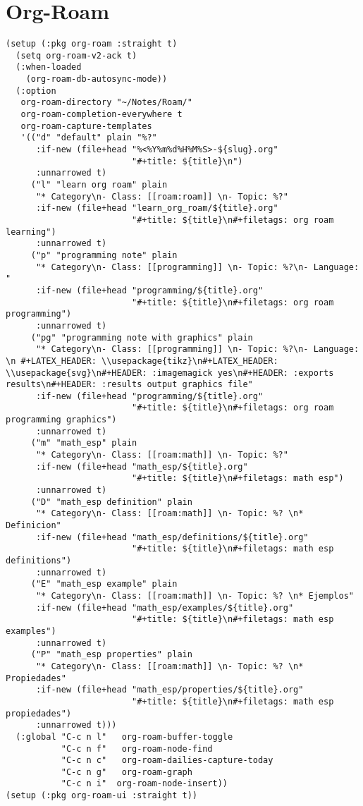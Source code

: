 \documentclass[11pt]{article}
\begin{document}
\section{Org-Roam}
\label{sec:orgd7336d6}

\begin{verbatim}
(setup (:pkg org-roam :straight t)
  (setq org-roam-v2-ack t)
  (:when-loaded
    (org-roam-db-autosync-mode))
  (:option
   org-roam-directory "~/Notes/Roam/"
   org-roam-completion-everywhere t
   org-roam-capture-templates
   '(("d" "default" plain "%?"
      :if-new (file+head "%<%Y%m%d%H%M%S>-${slug}.org"
                         "#+title: ${title}\n")
      :unnarrowed t)
     ("l" "learn org roam" plain
      "* Category\n- Class: [[roam:roam]] \n- Topic: %?"
      :if-new (file+head "learn_org_roam/${title}.org"
                         "#+title: ${title}\n#+filetags: org roam learning")
      :unnarrowed t)
     ("p" "programming note" plain
      "* Category\n- Class: [[programming]] \n- Topic: %?\n- Language: "
      :if-new (file+head "programming/${title}.org"
                         "#+title: ${title}\n#+filetags: org roam programming")
      :unnarrowed t)
     ("pg" "programming note with graphics" plain
      "* Category\n- Class: [[programming]] \n- Topic: %?\n- Language: \n #+LATEX_HEADER: \\usepackage{tikz}\n#+LATEX_HEADER: \\usepackage{svg}\n#+HEADER: :imagemagick yes\n#+HEADER: :exports results\n#+HEADER: :results output graphics file"
      :if-new (file+head "programming/${title}.org"
                         "#+title: ${title}\n#+filetags: org roam programming graphics")
      :unnarrowed t)
     ("m" "math_esp" plain
      "* Category\n- Class: [[roam:math]] \n- Topic: %?"
      :if-new (file+head "math_esp/${title}.org"
                         "#+title: ${title}\n#+filetags: math esp")
      :unnarrowed t)
     ("D" "math_esp definition" plain
      "* Category\n- Class: [[roam:math]] \n- Topic: %? \n* Definicion"
      :if-new (file+head "math_esp/definitions/${title}.org"
                         "#+title: ${title}\n#+filetags: math esp definitions")
      :unnarrowed t)
     ("E" "math_esp example" plain
      "* Category\n- Class: [[roam:math]] \n- Topic: %? \n* Ejemplos"
      :if-new (file+head "math_esp/examples/${title}.org"
                         "#+title: ${title}\n#+filetags: math esp examples")
      :unnarrowed t)
     ("P" "math_esp properties" plain
      "* Category\n- Class: [[roam:math]] \n- Topic: %? \n* Propiedades"
      :if-new (file+head "math_esp/properties/${title}.org"
                         "#+title: ${title}\n#+filetags: math esp propiedades")
      :unnarrowed t)))
  (:global "C-c n l"   org-roam-buffer-toggle
           "C-c n f"   org-roam-node-find
           "C-c n c"   org-roam-dailies-capture-today
           "C-c n g"   org-roam-graph
           "C-c n i"  org-roam-node-insert))
(setup (:pkg org-roam-ui :straight t))

\end{verbatim}
\end{document}
